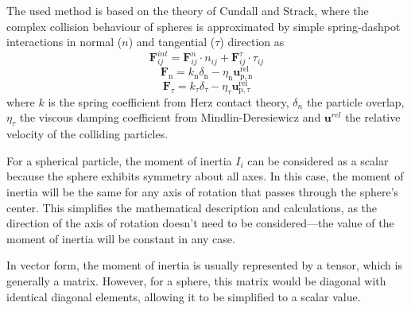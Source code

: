 The used method is based on the theory of Cundall and Strack\cite{cundall1979discrete}, where the complex collision behaviour of spheres is approximated by simple spring-dashpot interactions in normal ($n$) and tangential ($\tau$) direction as
\begin{equation}
\boldsymbol{F}_{i j}^{int}=\boldsymbol{F}_{i j}^{n} \cdot n_{i j}+\boldsymbol{F}_{i j}^{\tau} \cdot \tau_{i j}
\end{equation}
\begin{equation}
    \boldsymbol{F}_{\mathrm{n}}=k_{\mathrm{n}} \delta_{\mathrm{n}}-\eta_{\mathrm{n}} \boldsymbol{u}_{\mathrm{p}, \mathrm{n}}^{\mathrm{rel}}
\end{equation}
\begin{equation}
    \boldsymbol{F}_{\tau}=k_{\tau} \delta_{\tau}-\eta_{\tau} \boldsymbol{u}_{\mathrm{p},{\tau}}^{\mathrm{rel}}
\end{equation}
where $k$ is the spring coefficient from Herz contact theory, $\delta_n$ the particle overlap, $\eta_{\tau}$ the viscous damping coefficient from Mindlin-Deresiewicz \cite{mindlin1953elastic} and $\mathbf{u}^{rel}$ the relative velocity of the colliding particles.

For a spherical particle, the moment of inertia \( I_i \) can be considered as a scalar because the sphere exhibits symmetry about all axes. In this case, the moment of inertia will be the same for any axis of rotation that passes through the sphere's center. This simplifies the mathematical description and calculations, as the direction of the axis of rotation doesn't need to be considered—the value of the moment of inertia will be constant in any case.

In vector form, the moment of inertia is usually represented by a tensor, which is generally a matrix. However, for a sphere, this matrix would be diagonal with identical diagonal elements, allowing it to be simplified to a scalar value.

